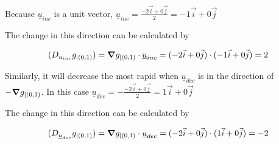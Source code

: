 \documentclass[12pt]{article} %
\begin{document}
\begin{homeworkProblem}
    Because $\underline{u}_{inc}$ is a unit vector, $\underline{u}_{inc} = \frac{-2\vec{i} + 0 \vec{j}}{2} = -1 \vec{i} + 0 \vec{j}$

    The change in this direction can be calculated by

    $$
        (D_{u_{inc}}g_{\mid (0, 1)}) = \gradient g_{\mid (0, 1)} \cdot \underline{u}_{inc} = (-2 \vec{i} + 0 \vec{j}) \cdot (-1\vec{i} + 0 \vec{j}) = 2
    $$

    Similarly, it will decrease the most rapid when $\underline{u}_{dec}$ is in the direction of $- \gradient g_{\mid (0, 1)}$. In this case $\underline{u}_{dec} = - \frac{-2\vec{i} + 0 \vec{j}}{2} = 1 \vec{i} + 0 \vec{j}$

    The change in this direction can be calculated by

    $$
        (D_{\underline{u}_{dec}}g_{\mid (0, 1)}) = \gradient g_{\mid (0, 1)} \cdot \underline{u}_{dec} = (-2 \vec{i} + 0 \vec{j}) \cdot (1\vec{i} + 0 \vec{j}) = -2
    $$

\end{homeworkProblem}
\pagebreak
\end{document}
